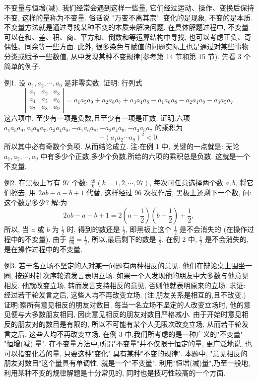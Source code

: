 
不变量与恒增(减).
我们经常会遇到这样一些量, 它们经过运动、操作、变换后保持不变, 这样的量称为不变量.
俗话说 "万变不离其宗". 变化的是现象, 不变的是本质.
不变量方法就是通过寻找某种不变的本质来解决问题.
在具体解题过程中, 不变量可以在和、差、积、商、平方和、倒数和等运算结构中寻找, 也可以考虑正负、奇偶性、同余等一些方面.
此外, 很多染色与赋值的问题实际上也是通过对某些事物分类或赋予一些数值, 从中发现某种不变规律(参考第 14 节和第 15 节).
先看 3 个简单的例子.



例1. 设 $a_1, a_2, \cdots, a_9$ 是非零实数.
证明: 行列式
$$
\left|\begin{array}{lll}
a_1 & a_2 & a_3 \\
a_4 & a_5 & a_6 \\
a_7 & a_8 & a_9
\end{array}\right|=a_1 a_5 a_9+a_2 a_6 a_7+a_3 a_4 a_8-a_1 a_6 a_8-a_2 a_4 a_9-a_3 a_5 a_7
$$
这六项中, 至少有一项是负数,且至少有一项是正数.
证明:六项 $a_1 a_5 a_9, a_2 a_6 a_7, a_3 a_4 a_8,-a_1 a_6 a_8,-a_2 a_4 a_9,-a_3 a_5 a_7$ 的乘积为
$$
-\left(a_1 a_2 \cdots a_9\right)^2<0 .
$$
所以其中必有奇数个负项.
从而结论成立.
注:在例 1 中, 关键的一点就是: 无论 $a_1, a_2, \cdots, a_9$ 中有多少个正数,多少个负数,所给的六项的乘积总是负数.
这就是一个不变量.



例2. 在黑板上写有 97 个数: $\frac{48}{k}(k=1,2, \cdots, 97)$, 每次可任意选择两个数 $a, b$, 将它们擦去, 用 $2 a b-a-b+1$ 代替, 这样经过 96 次操作后, 黑板上还剩下一个数, 问: 这个数是多少?
解:为
$$
2 a b-a-b+1=2\left(a-\frac{1}{2}\right)\left(b-\frac{1}{2}\right)+\frac{1}{2},
$$
所以, 当 $a$ 或 $b$ 为 $\frac{1}{2}$ 时, 得到的数还是 $\frac{1}{2}$, 即黑板上这个 $\frac{1}{2}$ 是不会消失的 (在操作过程中的不变量). 由于 $\frac{48}{96}=\frac{1}{2}$, 所以,最后剩下的数是 $\frac{1}{2}$.
在例 2 中, $\frac{1}{2}$ 是不会消失的, 是在操作过程中的不变量.



例3. 若干名立场不坚定的人对某一问题有两种相反的意见.
他们在辩论桌上围坐一圈, 按逆时针次序轮流发言表明立场.
如果一个人发现他的朋友中大多数与他意见相反, 他就改变立场, 转而发言支持相反的意见, 否则他就表明原来的立场.
求证: 经过若干轮发言之后, 这些人均不再改变立场.
(注:朋友关系是相互的,且不改变.)
证明:察所有意见相反的朋友对数目.
每当一名立场不坚定的人改变立场时, 他的意见便与大多数朋友相同, 因此意见相反的朋友对数目严格减小.
由于开始时意见相反的朋友对的数目是有限的, 所以不可能有某个人无限次改变立场, 从而若干轮发言之后, 这些人均不再改变立场.
在例 3 中,我们所考虑的是一种广义的"不变量"
"恒增(减) 量". 在不变量方法中,所谓"不变量"并不仅限于恒定的量, 更广泛地说, 也可以指变化着的量, 只要这种"变化" 具有某种"不变的规律". 本题中, "意见相反的朋友对数目"这个量具有单调性, 就是一个"不变量".
利用"恒增(减)量",乃至一般地,利用某种不变的规律解题是十分常见的, 同时也是技巧性较高的一个方面.



